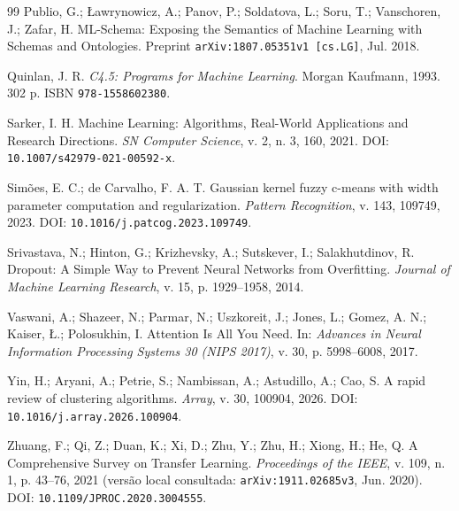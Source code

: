 \documentclass[11pt,a4paper]{article}
\begin{document}
{\begin{thebibliography}{99}
Publio, G.; Ławrynowicz, A.; Panov, P.; Soldatova, L.; Soru, T.; Vanschoren, J.; Zafar, H. ML-Schema: Exposing the Semantics of Machine Learning with Schemas and Ontologies. Preprint \texttt{arXiv:1807.05351v1 [cs.LG]}, Jul. 2018.

Quinlan, J. R. \emph{C4.5: Programs for Machine Learning}. Morgan Kaufmann, 1993. 302 p. ISBN \texttt{978-1558602380}.

Sarker, I. H. Machine Learning: Algorithms, Real-World Applications and Research Directions. \emph{SN Computer Science}, v. 2, n. 3, 160, 2021. DOI: \texttt{10.1007/s42979-021-00592-x}.

Simões, E. C.; de Carvalho, F. A. T. Gaussian kernel fuzzy c-means with width parameter computation and regularization. \emph{Pattern Recognition}, v. 143, 109749, 2023. DOI: \texttt{10.1016/j.patcog.2023.109749}.

Srivastava, N.; Hinton, G.; Krizhevsky, A.; Sutskever, I.; Salakhutdinov, R. Dropout: A Simple Way to Prevent Neural Networks from Overfitting. \emph{Journal of Machine Learning Research}, v. 15, p. 1929--1958, 2014.

Vaswani, A.; Shazeer, N.; Parmar, N.; Uszkoreit, J.; Jones, L.; Gomez, A. N.; Kaiser, Ł.; Polosukhin, I. Attention Is All You Need. In: \emph{Advances in Neural Information Processing Systems 30 (NIPS 2017)}, v. 30, p. 5998--6008, 2017.

Yin, H.; Aryani, A.; Petrie, S.; Nambissan, A.; Astudillo, A.; Cao, S. A rapid review of clustering algorithms. \emph{Array}, v. 30, 100904, 2026. DOI: \texttt{10.1016/j.array.2026.100904}.

Zhuang, F.; Qi, Z.; Duan, K.; Xi, D.; Zhu, Y.; Zhu, H.; Xiong, H.; He, Q. A Comprehensive Survey on Transfer Learning. \emph{Proceedings of the IEEE}, v. 109, n. 1, p. 43--76, 2021 (versão local consultada: \texttt{arXiv:1911.02685v3}, Jun. 2020). DOI: \texttt{10.1109/JPROC.2020.3004555}.

\end{thebibliography}
}
\end{document}
